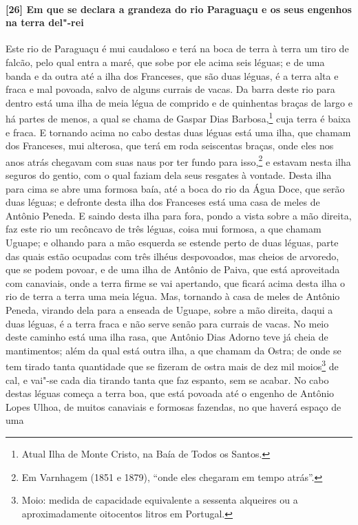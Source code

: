 \begin{linenumbers}
\paragraph{[26] Em que se declara a grandeza do rio Paraguaçu e os seus engenhos na terra
del"-rei}\quad
Este rio de Paraguaçu é mui caudaloso e terá na boca de terra à terra um tiro de falcão,
pelo qual entra a maré, que sobe por ele acima seis léguas; e de uma banda e da outra até
a ilha dos Franceses, que são duas léguas, é a terra alta e fraca e mal povoada, salvo de
alguns currais de vacas. Da barra deste rio para dentro está uma ilha de meia légua de
comprido e de quinhentas braças de largo e há partes de menos, a qual se chama de Gaspar
Dias Barbosa,\footnote{ Atual Ilha de Monte Cristo, na Baía de Todos os Santos.} cuja
terra é baixa e fraca. E tornando acima no cabo destas duas léguas está uma ilha, que
chamam dos Franceses, mui alterosa, que terá em roda seiscentas braças, onde eles nos anos
atrás chegavam com suas naus por ter fundo para isso,\footnote{ Em Varnhagem (1851 e
1879), ``onde eles chegaram em tempo atrás''.} e estavam nesta ilha seguros do gentio, com
o qual faziam dela seus resgates à vontade. Desta ilha para cima se abre uma formosa baía,
até a boca do rio da Água Doce, que serão duas léguas; e defronte desta ilha dos Franceses
está uma casa de meles de Antônio Peneda. E saindo desta ilha para fora, pondo a vista
sobre a mão direita, faz este rio um recôncavo de três léguas, coisa mui formosa, a que
chamam Uguape; e olhando para a mão esquerda se estende perto de duas léguas, parte das
quais estão ocupadas com três ilhéus despovoados, mas cheios de arvoredo, que se podem
povoar, e de uma ilha de Antônio de Paiva, que está aproveitada com canaviais, onde a
terra firme se vai apertando, que ficará acima desta ilha o rio de terra a terra uma meia
légua. Mas, tornando à casa de meles de Antônio Peneda, virando dela para a enseada de
Uguape, sobre a mão direita, daqui a duas léguas, é a terra fraca e não serve senão para
currais de vacas. No meio deste caminho está uma ilha rasa, que Antônio Dias Adorno teve
já cheia de mantimentos; além da qual está outra ilha, a que chamam da Ostra; de onde se
tem tirado tanta quantidade que se fizeram de ostra mais de dez mil moios\footnote{ Moio:
medida de capacidade equivalente a sessenta alqueires ou a aproximadamente oitocentos
litros em Portugal.} de cal, e vai"-se cada dia tirando tanta que faz espanto, sem se
acabar. No cabo destas léguas começa a terra boa, que está povoada até o engenho de
Antônio Lopes Ulhoa, de muitos canaviais e formosas fazendas, no que haverá espaço de uma

\end{linenumbers}
